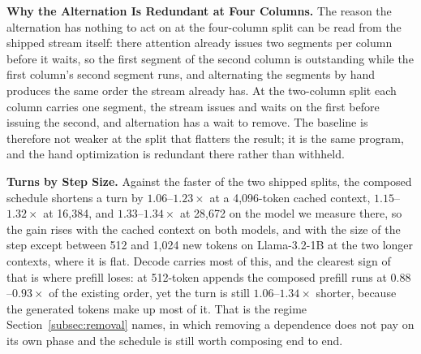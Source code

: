 \textbf{Why the Alternation Is Redundant at Four Columns.}
The reason the alternation has nothing to act on at the four-column split can be read from the shipped stream itself: there attention already issues two segments per column before it waits, so the first segment of the second column is outstanding while the first column's second segment runs, and alternating the segments by hand produces the same order the stream already has.
At the two-column split each column carries one segment, the stream issues and waits on the first before issuing the second, and alternation has a wait to remove.
The baseline is therefore not weaker at the split that flatters the result; it is the same program, and the hand optimization is redundant there rather than withheld.

\textbf{Turns by Step Size.}
Against the faster of the two shipped splits, the composed schedule shortens a turn by $1.06$--$1.23\times$ at a 4{,}096-token cached context, $1.15$--$1.32\times$ at 16{,}384, and $1.33$--$1.34\times$ at 28{,}672 on the model we measure there, so the gain rises with the cached context on both models, and with the size of the step except between 512 and 1{,}024 new tokens on Llama-3.2-1B at the two longer contexts, where it is flat.
Decode carries most of this, and the clearest sign of that is where prefill loses: at 512-token appends the composed prefill runs at $0.88$--$0.93\times$ of the existing order, yet the turn is still $1.06$--$1.34\times$ shorter, because the generated tokens make up most of it.
That is the regime Section~\ref{subsec:removal} names, in which removing a dependence does not pay on its own phase and the schedule is still worth composing end to end.

